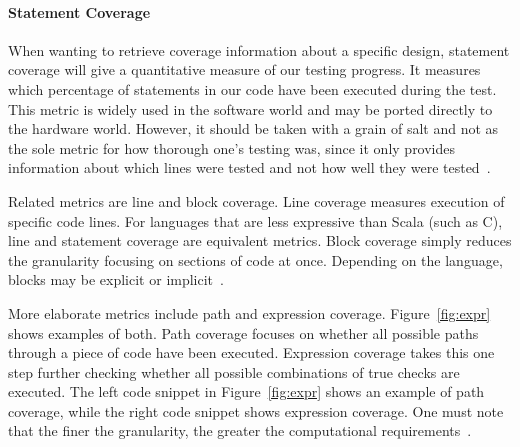 \documentclass[conference]{IEEEtran}
\newcommand{\hjd}[1]{{\color{pink} Hans: #1}}
\begin{document}
\paragraph{Statement Coverage} When wanting to retrieve coverage information about a specific design, statement coverage will give a quantitative measure of our testing progress. It measures which percentage of statements in our code have been executed during the test. This metric is widely used in the software world and may be ported directly to the hardware world. However, it should be taken with a grain of salt and not as the sole metric for how thorough one's testing was, since it only provides information about which lines were tested and not how well they were tested~\cite{hdlverify}. %

Related metrics are line and block coverage. Line coverage measures execution of specific code lines. For languages that are less expressive than Scala (such as C), line and statement coverage are equivalent metrics. Block coverage simply reduces the granularity focusing on sections of code at once. Depending on the language, blocks may be explicit or implicit~\cite{hdlverify}. %


More elaborate metrics include path and expression coverage. Figure~\ref{fig:expr} shows examples of both. Path coverage focuses on whether all possible paths through a piece of code have been executed. 
Expression coverage takes this one step further checking whether all possible combinations of true checks are executed. The left code snippet in Figure~\ref{fig:expr} shows an example of path coverage, while the right code snippet shows expression coverage. One must note that the finer the granularity, the greater the computational requirements~\cite{hdlverify}. %
\end{document}
